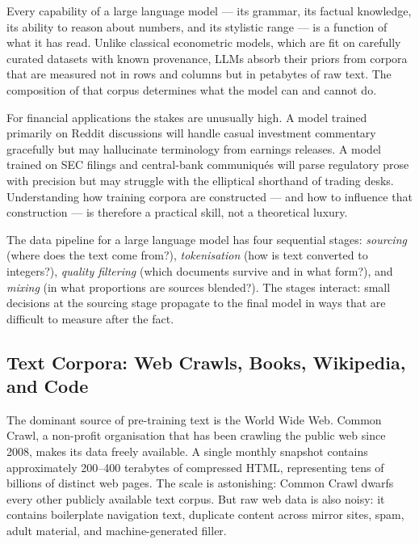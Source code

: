 \begin{context}
Every capability of a large language model --- its grammar, its factual knowledge,
its ability to reason about numbers, and its stylistic range --- is a function of
what it has read.  Unlike classical econometric models, which are fit on
carefully curated datasets with known provenance, LLMs absorb their priors from
corpora that are measured not in rows and columns but in petabytes of raw text.
The composition of that corpus determines what the model can and cannot do.

For financial applications the stakes are unusually high.  A model trained
primarily on Reddit discussions will handle casual investment commentary gracefully
but may hallucinate terminology from earnings releases.  A model trained on SEC
filings and central-bank communiqu\'{e}s will parse regulatory prose with
precision but may struggle with the elliptical shorthand of trading desks.
Understanding how training corpora are constructed --- and how to influence that
construction --- is therefore a practical skill, not a theoretical luxury.

The data pipeline for a large language model has four sequential stages:
\emph{sourcing} (where does the text come from?), \emph{tokenisation}
(how is text converted to integers?), \emph{quality filtering}
(which documents survive and in what form?), and \emph{mixing} (in what
proportions are sources blended?).  The stages interact: small decisions at
the sourcing stage propagate to the final model in ways that are difficult
to measure after the fact.

\subsection{Text Corpora: Web Crawls, Books, Wikipedia, and Code}
\label{subsec:text-corpora}

The dominant source of pre-training text is the World Wide Web.  Common Crawl,
a non-profit organisation that has been crawling the public web since 2008,
makes its data freely available.  A single monthly snapshot contains
approximately 200--400 terabytes of compressed HTML, representing tens of
billions of distinct web pages.  The scale is astonishing: Common Crawl dwarfs
every other publicly available text corpus.  But raw web data is also noisy:
it contains boilerplate navigation text, duplicate content across mirror sites,
spam, adult material, and machine-generated filler.


\end{context}
